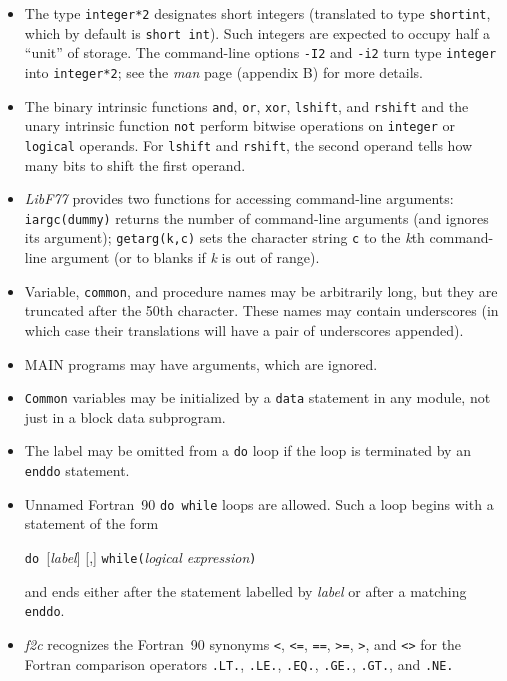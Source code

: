 \documentclass[12pt]{article}
\begin{document}
\begin{itemize}
\item The type \verb|integer*2| designates short integers (translated to type \verb|shortint|, which by default is \verb|short int|). Such integers are expected to occupy half a ``unit'' of storage. The command-line options \verb|-I2| and \verb|-i2| turn type \verb|integer| into \verb|integer*2|; see the \emph{man} page (appendix B) for more details.

\item The binary intrinsic functions \verb|and|, \verb|or|, \verb|xor|, \verb|lshift|, and \verb|rshift| and the unary intrinsic function \verb|not| perform bitwise operations on \verb|integer| or \verb|logical| operands. For \verb|lshift| and \verb|rshift|, the second operand tells how many bits to shift the first operand.

\item \emph{LibF77} provides two functions for accessing command-line arguments: \verb|iargc(dummy)| returns the number of command-line arguments (and ignores its argument); \verb|getarg(k,c)| sets the character string \verb|c| to the \emph{k}th command-line argument (or to blanks if \emph{k} is out of range).

\item Variable, \verb|common|, and procedure names may be arbitrarily long, but they are truncated after the 50th character. These names may contain underscores (in which case their translations will have a pair of underscores appended).

\item MAIN programs may have arguments, which are ignored.

\item \verb|Common| variables may be initialized by a \verb|data| statement in any module, not just in a block data subprogram.

\item The label may be omitted from a \verb|do| loop if the loop is terminated by an \verb|enddo| statement.

\item Unnamed Fortran~90 \verb|do while| loops are allowed. Such a loop begins with a statement of the form
\begin{center}
\verb|do |[\emph{label}] [,] \verb|while(|\emph{logical expression}\verb|)|
\end{center}
and ends either after the statement labelled by \emph{label} or after a matching \verb|enddo|.

\item \emph{f2c} recognizes the Fortran~90 synonyms \verb|<|, \verb|<=|, \verb|==|, \verb|>=|, \verb|>|, and \verb|<>| for the Fortran comparison operators \verb|.LT.|, \verb|.LE.|, \verb|.EQ.|, \verb|.GE.|, \verb|.GT.|, and \verb|.NE.|


\end{itemize}
\end{document}
